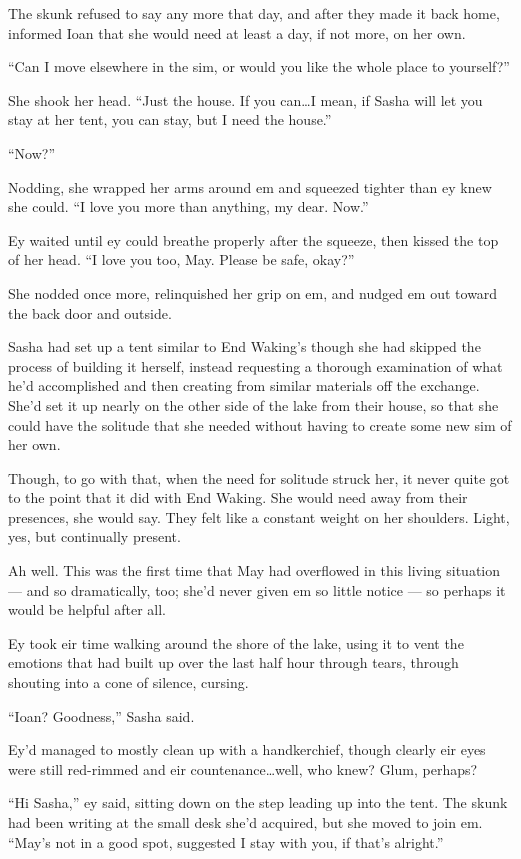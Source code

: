 The skunk refused to say any more that day, and after they made it back home, informed Ioan that she would need at least a day, if not more, on her own.

``Can I move elsewhere in the sim, or would you like the whole place to yourself?''

She shook her head. ``Just the house. If you can\ldots I mean, if Sasha will let you stay at her tent, you can stay, but I need the house.''

``Now?''

Nodding, she wrapped her arms around em and squeezed tighter than ey knew she could. ``I love you more than anything, my dear. Now.''

Ey waited until ey could breathe properly after the squeeze, then kissed the top of her head. ``I love you too, May. Please be safe, okay?''

She nodded once more, relinquished her grip on em, and nudged em out toward the back door and outside.

Sasha had set up a tent similar to End Waking's though she had skipped the process of building it herself, instead requesting a thorough examination of what he'd accomplished and then creating from similar materials off the exchange. She'd set it up nearly on the other side of the lake from their house, so that she could have the solitude that she needed without having to create some new sim of her own.

Though, to go with that, when the need for solitude struck her, it never quite got to the point that it did with End Waking. She would need away from their presences, she would say. They felt like a constant weight on her shoulders. Light, yes, but continually present.

Ah well. This was the first time that May had overflowed in this living situation — and so dramatically, too; she'd never given em so little notice — so perhaps it would be helpful after all.

Ey took eir time walking around the shore of the lake, using it to vent the emotions that had built up over the last half hour through tears, through shouting into a cone of silence, cursing.

``Ioan? Goodness,'' Sasha said.

Ey'd managed to mostly clean up with a handkerchief, though clearly eir eyes were still red-rimmed and eir countenance\ldots well, who knew? Glum, perhaps?

``Hi Sasha,'' ey said, sitting down on the step leading up into the tent. The skunk had been writing at the small desk she'd acquired, but she moved to join em. ``May's not in a good spot, suggested I stay with you, if that's alright.''

